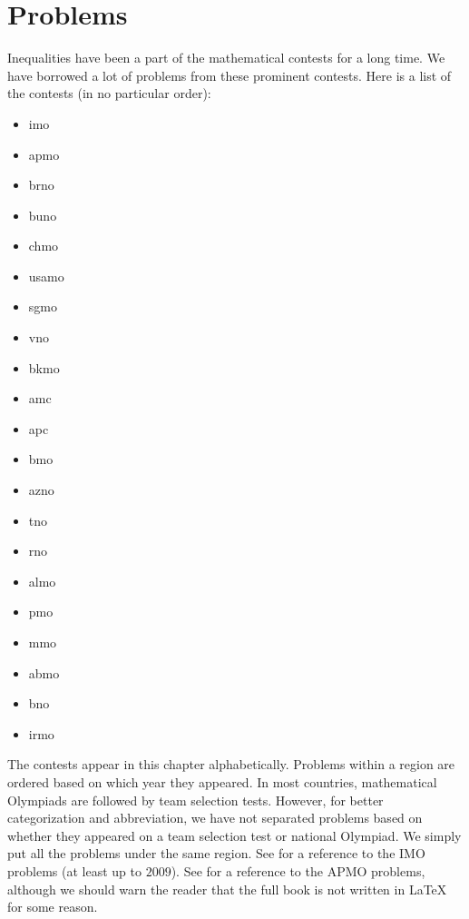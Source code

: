 \documentclass{subfile}
\begin{document}
	\chapter{Problems}\label{ch:problems}
	Inequalities have been a part of the mathematical contests for a long time. We have borrowed a lot of problems from these prominent contests. Here is a list of the contests (in no particular order):
		\begin{itemize}
			\item \Gls{imo}
			\item \Gls{apmo}
			\item \Gls{brno}
			\item \Gls{buno}
			\item \Gls{chmo}
			\item \Gls{usamo}
			\item \Gls{sgmo}
			\item \Gls{vno}
			\item \Gls{bkmo}
			\item \Gls{amc}
			\item \Gls{apc}
			\item \Gls{bmo}
			\item \Gls{azno}
			\item \Gls{tno}
			\item \Gls{rno}
			\item \Gls{almo}
			\item \Gls{pmo}
			\item \Gls{mmo}
			\item \Gls{abmo}
			\item \Gls{bno}
			\item \Gls{irmo}
		\end{itemize}
	
	The contests appear in this chapter alphabetically. Problems within a region are ordered based on which year they appeared. In most countries, mathematical Olympiads are followed by team selection tests. However, for better categorization and abbreviation, we have not separated problems based on whether they appeared on a team selection test or national Olympiad. We simply put all the problems under the same region. See \textcite{djukicc_jankovic_matic_2011} for a reference to the IMO problems (at least up to $2009$). See \textcite{dongphd_suugaku_2009} for a reference to the APMO problems, although we should warn the reader that the full book is not written in \LaTeX{} for some reason.
\end{document}
